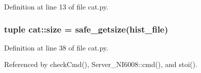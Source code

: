 Definition at line 13 of file cat.py.\hypertarget{namespacecat_a9299435c5156f5bdf06840adae40901c}{
\subsubsection[{size}]{\setlength{\rightskip}{0pt plus 5cm}tuple {\bf cat::size} = safe\_\-getsize({\bf hist\_\-file})}}
\label{namespacecat_a9299435c5156f5bdf06840adae40901c}


Definition at line 38 of file cat.py.

Referenced by checkCmd(), Server\_\-NI6008::cmd(), and stoi().